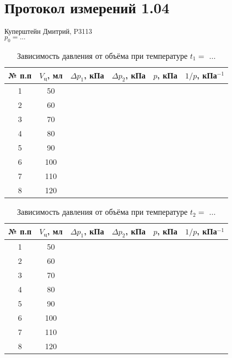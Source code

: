 \documentclass[11pt]{article}
\begin{document}
\thispagestyle{empty}
\section*{Протокол измерений 1.04}
Куперштейн Дмитрий, P3113\\

\large
$p_0 = ...$
\begin{table}[H]
	\centering
	\renewcommand\thetable{1.1}
	\caption{Зависимость давления от объёма при температуре $t_1 = $ ...}
	\begin{tabular}{|c|c|c|c|c|c|}
		\hline
		№ п.п & $V_ц$, мл & $\Delta p_1$, кПа & $\Delta p_2$, кПа & $p$, кПа & $1/p$, кПа$^{-1}$\\
		\hline
		1 & 50 & & & &\\
		\hline
		2 & 60 & & & &\\
		\hline
		3 & 70 & & & &\\
		\hline
		4 & 80 & & & &\\
		\hline
		5 & 90 & & & &\\
		\hline
		6 & 100 & & & &\\
		\hline
		7 & 110 & & & &\\
		\hline
		8 & 120 & & & &\\
		\hline
	\end{tabular}
\end{table}
\begin{table}[H]
	\centering
	\renewcommand\thetable{1.2}
	\caption{Зависимость давления от объёма при температуре $t_2 = $ ...}
	\begin{tabular}{|c|c|c|c|c|c|}
		\hline
		№ п.п & $V_ц$, мл & $\Delta p_1$, кПа & $\Delta p_2$, кПа & $p$, кПа & $1/p$, кПа$^{-1}$\\
		\hline
		1 & 50 & & & &\\
		\hline
		2 & 60 & & & &\\
		\hline
		3 & 70 & & & &\\
		\hline
		4 & 80 & & & &\\
		\hline
		5 & 90 & & & &\\
		\hline
		6 & 100 & & & &\\
		\hline
		7 & 110 & & & &\\
		\hline
		8 & 120 & & & &\\
		\hline
	\end{tabular}
\end{table}
\end{document}
